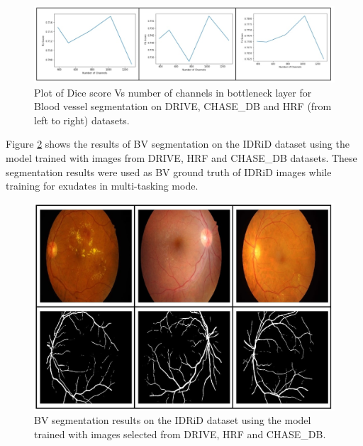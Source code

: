 \documentclass[utf8]{FrontiersinHarvard} %
\begin{document}
\begin{figure}[h!]
\begin{center}
\includegraphics[width=15cm]{images/channel_vs_dice.jpg}%
\end{center}
\caption{Plot of Dice score Vs number of channels in bottleneck layer for Blood vessel segmentation on DRIVE, CHASE\_DB and HRF (from left to right) datasets.}
\label{fig:channel_vs_dice}
\end{figure}


Figure \ref{fig:bv_results_idrid} shows the results of BV segmentation on the IDRiD dataset using the model trained with images from  DRIVE, HRF and CHASE\_DB datasets. These segmentation results were used as BV ground truth of IDRiD images while training  for exudates in multi-tasking mode.

\begin{figure}[ht!]
\begin{center}
\includegraphics[width=15cm]{images/bv_results_idrid.jpg} %
\end{center}
\caption{BV segmentation results on the IDRiD dataset using the model trained with images selected from DRIVE, HRF and CHASE\_DB.}
\label{fig:bv_results_idrid}
\end{figure}
\end{document}
